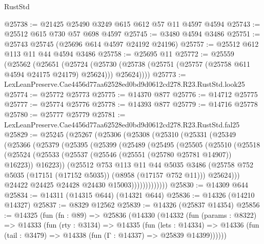 \begin{lexlean}{RustStd}
\begin{coremodule}
@25738 := @21425 @25490 @3249 @615 @612 @57 @11 @4597 @4594
@25743 := @25512 @615 @730 @57 @698 @4597
@25745 := @3480 @4594 @3486
@25751 := @25743 @25745 (@25696 @614 @4597 @24192 @24196)
@25757 := @25512 @612 @113 @11 @44 @4594 @3486
@25758 := @25695 @11
@25772 := @25559
    (@25562
      (@25651
        (@25724
          (@25730 (@25738 (@25751 (@25757 (@25758 @611 @4594 @24175 @24179) @25624))) @25624))))
@25773 := LexLeanPreserve.Cae4456d77aa62528ed0bd9d0612cd278.R23.RustStd.look25
@25774 := @25772 @25773
@25775 := @14370 @877
@25776 := @14712 @25775
@25777 := @25774 @25776
@25778 := @14393 @877
@25779 := @14716 @25778
@25780 := @25777 @25779
@25781 := LexLeanPreserve.Cae4456d77aa62528ed0bd9d0612cd278.R23.RustStd.fal25
@25829 := @25245
    (@25267
      (@25306
        (@25308
          (@25310
            (@25331
              (@25349
                (@25366
                  (@25379
                    (@25395
                      (@25399
                        (@25489
                          (@25495
                            (@25505
                              (@25510
                                (@25518
                                  (@25524
                                    (@25533
                                      (@25537 (@25546 (@25551 (@25780 @25781 @14907)) @16223))
                                      @16223))
                                  (@25512
                                    @753
                                    @113
                                    @11
                                    @44
                                    @5035
                                    @3486
                                    (@25758
                                      @752
                                      @5035
                                      (@17151 (@17152 @5035))
                                      (@8958 (@17157 @752 @11)))
                                    @25624)))
                              @24422
                              @24425
                              @24428
                              @24430
                              @15003)))))))))))))
@25830 := @14309 @644
@25834 := @14311 (@14315 @644) (@14321 @644)
@25836 := @14326 (@14210 @14327)
@25837 := @8329 @12562
@25839 := @14326 (@25837 @14354)
@25856 := @14325
    (fun (fn : @89) =>
    @25836
      (@14330
        (@14332
          (fun (params : @8322) =>
          @14333
            (fun (rty : @3134) =>
            @14335
              (fun (lets : @14334) =>
              @14336 (fun (tail : @3479) => @14338 (fun (Γ : @14337) => @25839 @14399))))))

\end{coremodule}
\end{lexlean}
